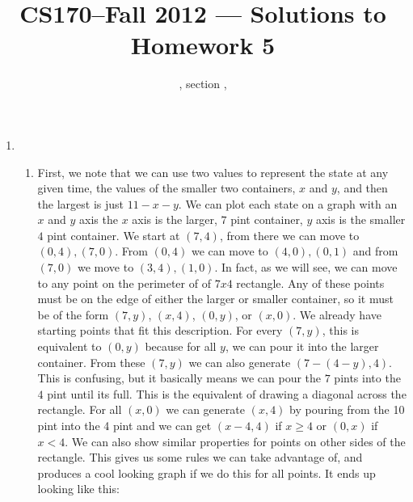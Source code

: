 \documentclass[11pt]{article}
\title{CS170--Fall 2012 --- Solutions to Homework 5}
\author{\Name, section \Sec, \texttt{\Login}}
\begin{document}
\maketitle

\begin{enumerate}
\item
\begin{enumerate}
\item First, we note that we can use two values to represent the state at any given time, the values of the smaller two containers, $x$ and $y$, and then the largest is just $11-x-y$. We can plot each state on a graph with an $x$ and $y$ axis the $x$ axis is the larger, $7$ pint container, $y$ axis is the smaller $4$ pint container. We start at $(7,4)$, from there we can move to $(0,4),(7,0)$. From $(0,4)$ we can move to $(4,0),(0,1)$ and from $(7,0)$ we move to $(3,4),(1,0)$. In fact, as we will see, we can move to any point on the perimeter of of $7x4$ rectangle. Any of these points must be on the edge of either the larger or smaller container, so it must be of the form $(7,y)$, $(x,4)$, $(0,y)$, or $(x,0)$. We already have starting points that fit this description. For every $(7,y)$, this is equivalent to $(0,y)$ because for all $y$, we can pour it into the larger container. From these $(7,y)$ we can also generate $(7-(4-y),4)$. This is confusing, but it basically means we can pour the $7$ pints into the $4$ pint until its full. This is the equivalent of drawing a diagonal across the rectangle. For all $(x,0)$ we can generate $(x,4)$ by pouring from the 10 pint into the 4 pint and we can get $(x-4,4)$ if $x\ge 4$ or $(0,x)$ if $x < 4$. We can also show similar properties for points on other sides of the rectangle. This gives us some rules we can take advantage of, and produces a cool looking graph if we do this for all points. It ends up looking like this:\\
\end{enumerate}
\end{enumerate}
\end{document}
